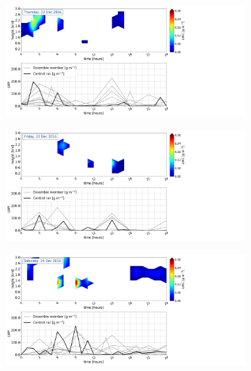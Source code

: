 \begin{figure}\ContinuedFloat
	\centering
		\begin{subfigure}[b]{0.8\textwidth}
			\includegraphics[trim={0.5cm 0.5cm 17.5cm .5cm},clip,width=\textwidth]{./fig_LWC/20161222}
			\caption{}\label{fig:LWC22}
		\end{subfigure}
		\begin{subfigure}[b]{0.8\textwidth}
			\includegraphics[trim={0.5cm 0.5cm 17.5cm .5cm},clip,width=\textwidth]{./fig_LWC/20161223}
			\caption{}\label{fig:LWC23}
		\end{subfigure}
		\begin{subfigure}[b]{0.8\textwidth}
			\includegraphics[trim={0.5cm 0.5cm 17.5cm .5cm},clip,width=\textwidth]{./fig_LWC/20161224}
			\caption{}\label{fig:LWC24}
		\end{subfigure}
\end{figure}
